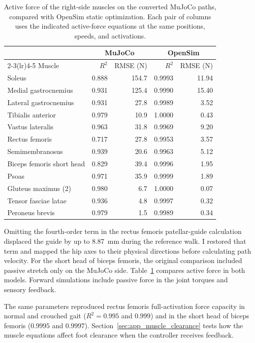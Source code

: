 \begin{table}[htbp]
  \centering\small
  \caption[Active muscle force during the reference walk]{Active force of the right-side muscles on the converted MuJoCo paths, compared with OpenSim static optimization. Each pair of columns uses the indicated active-force equations at the same positions, speeds, and activations.}
  \label{tab:force-r2}
  \begin{tabular}{lrrrr}
    \toprule
    & \multicolumn{2}{c}{MuJoCo} & \multicolumn{2}{c}{OpenSim} \\
    \cmidrule(lr){2-3}\cmidrule(lr){4-5}
    Muscle & $R^2$ & RMSE (N) & $R^2$ & RMSE (N) \\
    \midrule
    Soleus & 0.888 & 154.7 & 0.9993 & 11.94 \\
    Medial gastrocnemius & 0.931 & 125.4 & 0.9990 & 15.40 \\
    Lateral gastrocnemius & 0.931 & 27.8 & 0.9989 & 3.52 \\
    Tibialis anterior & 0.979 & 10.9 & 1.0000 & 0.43 \\
    Vastus lateralis & 0.963 & 31.8 & 0.9969 & 9.20 \\
    Rectus femoris & 0.717 & 27.8 & 0.9953 & 3.57 \\
    Semimembranosus & 0.939 & 20.6 & 0.9963 & 5.12 \\
    Biceps femoris short head & 0.829 & 39.4 & 0.9996 & 1.95 \\
    Psoas & 0.971 & 35.9 & 0.9999 & 1.89 \\
    Gluteus maximus (2) & 0.980 & 6.7 & 1.0000 & 0.07 \\
    Tensor fasciae latae & 0.936 & 4.8 & 0.9997 & 0.32 \\
    Peroneus brevis & 0.979 & 1.5 & 0.9989 & 0.34 \\
    \bottomrule
  \end{tabular}
\end{table}

Omitting the fourth-order term in the rectus femoris patellar-guide calculation displaced the guide by up to \qty{8.87}{\milli\meter} during the reference walk. I restored that term and mapped the hip axes to their physical directions before calculating path velocity. For the short head of biceps femoris, the original comparison included passive stretch only on the MuJoCo side. Table~\ref{tab:force-r2} compares active force in both models. Forward simulations include passive force in the joint torques and sensory feedback.

The same parameters reproduced rectus femoris full-activation force capacity in normal and crouched gait ($R^2=0.995$ and $0.999$) and in the short head of biceps femoris ($0.9995$ and $0.9997$). Section~\ref{sec:app_muscle_clearance} tests how the muscle equations affect foot clearance when the controller receives feedback.

